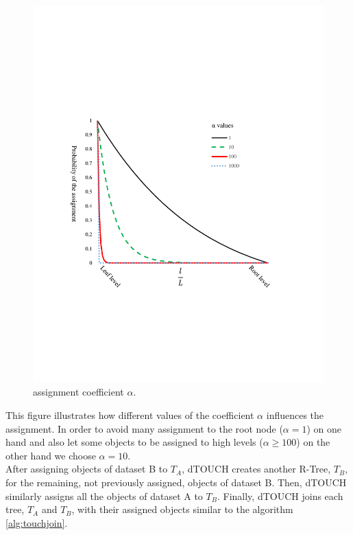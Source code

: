 \documentclass{vldb}
\newcommand{\dSJ}{dTOUCH}
\begin{document}
\begin{figure}
    \centering
    \includegraphics[width=0.48\columnwidth]{figures/alpha}
    \caption*{assignment coefficient $\alpha$.}
    \label{fig:alpha}
\end{figure}

This figure illustrates how different values of the coefficient $\alpha$ influences the assignment. In order to avoid many assignment to the root node ($\alpha=1$) on one hand and also let some objects to be assigned to high levels ($\alpha \geq 100$) on the other hand we choose $\alpha=10$.\\

After assigning objects of dataset B to $T_A$, {\dSJ} creates another R-Tree, $T_B$, for the remaining, not previously assigned, objects of dataset B. Then, {\dSJ} similarly assigns all the objects of dataset A to $T_B$. Finally, {\dSJ} joins each tree, $T_A$ and $T_B$, with their assigned objects similar to the algorithm \ref{alg:touchjoin}.

\begin{algorithm}
\caption{dTOUCH algorithm, Assignment restriction part}\label{alg:DTOUCH}
\begin{algorithmic}[1]
\setcounter{ALG@line}{\ref{alg:assign:assigns}}
	  	\EndIf
	  	\State{\Continue}
	\EndIf
\EndFunction
\end{algorithmic}
\end{algorithm}
\end{document}
